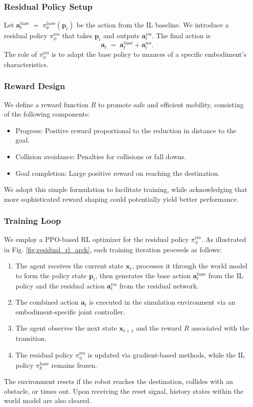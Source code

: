 \documentclass[letterpaper, 10 pt,conference]{ieeeconf}
\begin{document}
\subsubsection{Residual Policy Setup}
Let $\mathbf{a}^{\text{base}}_t \;=\; \pi_{\theta}^{\text{base}}(\mathbf{p}_t)$ be the action from the IL baseline. We introduce a residual policy $\pi_{\phi}^{\text{res}}$ that takes $\mathbf{p}_t$ and outputs $\mathbf{a}^{\text{res}}_t$. The final action is
\[
    \mathbf{a}_t \;=\; \mathbf{a}^{\text{base}}_t + \mathbf{a}^{\text{res}}_t.
\]
The role of $\pi_{\phi}^{\text{res}}$ is to adapt the base policy to nuances of a specific embodiment’s characteristics.

\subsubsection{Reward Design}
We define a reward function $R$ to promote safe and efficient mobility, consisting of the following components:
\begin{itemize}
    \item Progress: Positive reward proportional to the reduction in distance to the goal.
    \item Collision avoidance: Penalties for collisions or fall downs.
    \item Goal completion: Large positive reward on reaching the destination.
\end{itemize}
We adopt this simple formulation to facilitate training, while acknowledging that more sophisticated reward shaping could potentially yield better performance.

\subsubsection{Training Loop}
We employ a PPO-based RL optimizer \cite{schulman2017proximal} for the residual policy $\pi_{\phi}^{\text{res}}$. As illustrated in Fig. \ref{fig:residual_rl_arch}, each training iteration proceeds as follows:
\begin{enumerate}
    \item The agent receives the current state $\mathbf{x}_t$, processes it through the world model to form the policy state $\mathbf{p}_t$, then generates the base action $\mathbf{a}^{\text{base}}_t$ from the IL policy and the residual action $\mathbf{a}^{\text{res}}_t$ from the residual network. 
    \item The combined action $\mathbf{a}_t$ is executed in the simulation environment via an embodiment-specific joint controller.
    \item The agent observes the next state $\mathbf{x}_{t+1}$ and the reward $R$ associated with the transition. 
    \item The residual policy $\pi_{\phi}^{\text{res}}$ is updated via gradient-based methods, while the IL policy $\pi_{\theta}^{\text{base}}$ remains frozen.
\end{enumerate}
The environment resets if the robot reaches the destination, collides with an obstacle, or times out. Upon receiving the reset signal, history states within the world model are also cleared.
\end{document}
